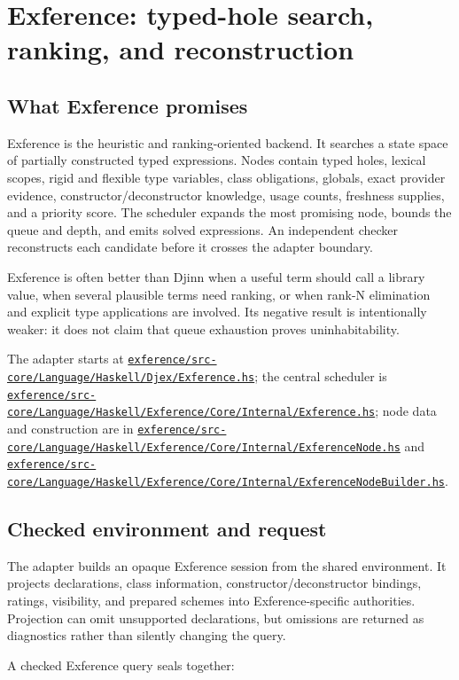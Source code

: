 \documentclass[10pt,letterpaper,oneside]{report}
\def\DjexBase{https://github.com/VladimirReshetnikov/Djex/blob/e454757d53ec057238c22fc6cd0d935b7d96b3dc/}
\newcommand{\dpath}[1]{\href{\DjexBase#1}{\nolinkurl{#1}}}
\begin{document}
\chapter{Exference: typed-hole search, ranking, and reconstruction}\label{ch:exference}

\section{What Exference promises}

Exference is the heuristic and ranking-oriented backend. It searches a state space of partially constructed typed expressions. Nodes contain typed holes, lexical scopes, rigid and flexible type variables, class obligations, globals, exact provider evidence, constructor/deconstructor knowledge, usage counts, freshness supplies, and a priority score. The scheduler expands the most promising node, bounds the queue and depth, and emits solved expressions. An independent checker reconstructs each candidate before it crosses the adapter boundary.

Exference is often better than Djinn when a useful term should call a library value, when several plausible terms need ranking, or when rank-N elimination and explicit type applications are involved. Its negative result is intentionally weaker: it does not claim that queue exhaustion proves uninhabitability.

The adapter starts at \dpath{exference/src-core/Language/Haskell/Djex/Exference.hs}; the central scheduler is \dpath{exference/src-core/Language/Haskell/Exference/Core/Internal/Exference.hs}; node data and construction are in \dpath{exference/src-core/Language/Haskell/Exference/Core/Internal/ExferenceNode.hs} and \dpath{exference/src-core/Language/Haskell/Exference/Core/Internal/ExferenceNodeBuilder.hs}.

\section{Checked environment and request}

The adapter builds an opaque Exference session from the shared environment. It projects declarations, class information, constructor/deconstructor bindings, ratings, visibility, and prepared schemes into Exference-specific authorities. Projection can omit unsupported declarations, but omissions are returned as diagnostics rather than silently changing the query.

A checked Exference query seals together:
\end{document}
